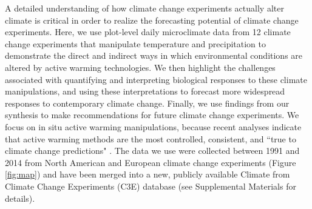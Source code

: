 \documentclass{article}
\begin{document}
\par A detailed understanding of how climate change experiments actually alter climate is critical in order to realize the forecasting potential of climate change experiments. Here, we use  plot-level daily  microclimate  data  from  12 climate  change  experiments  that  manipulate temperature and precipitation to demonstrate the direct and indirect ways in which environmental conditions are altered  by active  warming technologies. We then highlight the challenges associated with quantifying and interpreting biological responses to these climate manipulations, and using these interpretations to forecast  more widespread responses to contemporary climate change. Finally,  we use findings from our synthesis to make recommendations for future  climate  change experiments.  We focus on in situ active warming  manipulations, because recent analyses indicate that active warming methods are the most controlled, consistent, and ``true to climate change predictions" \citep{kimball2005,kimball2008,aronson2009,wolkovich2012}. The data we use were collected between 1991 and 2014 from North American and European climate change experiments (Figure \ref{fig:map}) and  have been merged into a new, publicly  available  Climate from Climate Change Experiments (C3E) database (see Supplemental Materials  for details). 

\end{document}
